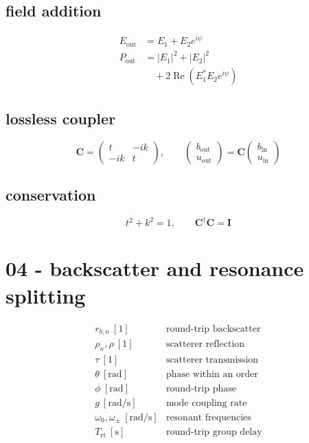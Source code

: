 \subsection*{field addition}
\[
\displaystyle \begin{aligned}E_{\mathrm{out}}&=E_1+E_2e^{i\psi}\\P_{\mathrm{out}}&=|E_1|^2+|E_2|^2\\&\quad+2\operatorname{Re}\!\left(E_1^*E_2e^{i\psi}\right)\end{aligned}
\]

\subsection*{lossless coupler}
\[
\displaystyle \mathbf C=\begin{pmatrix}t&-ik\\-ik&t\end{pmatrix},\qquad\begin{pmatrix}b_{\mathrm{out}}\\u_{\mathrm{out}}\end{pmatrix}=\mathbf C\begin{pmatrix}b_{\mathrm{in}}\\u_{\mathrm{in}}\end{pmatrix}
\]

\subsection*{conservation}
\[
\displaystyle t^2+k^2=1,\qquad \mathbf C^{\dagger}\mathbf C=\mathbf I
\]

\clearpage
\section*{04 - backscatter and resonance splitting}

\[
\begin{array}{ll}r_{b,n}\ [1]&\text{round-trip backscatter}\\[0.6em]\rho_n,\rho\ [1]&\text{scatterer reflection}\\[0.6em]\tau\ [1]&\text{scatterer transmission}\\[0.6em]\theta\ [\mathrm{rad}]&\text{phase within an order}\\[0.6em]\phi\ [\mathrm{rad}]&\text{round-trip phase}\\[0.6em]g\ [\mathrm{rad/s}]&\text{mode coupling rate}\\[0.6em]\omega_0,\omega_\pm\ [\mathrm{rad/s}]&\text{resonant frequencies}\\[0.6em]T_{\mathrm{rt}}\ [\mathrm s]&\text{round-trip group delay}\end{array}
\]

